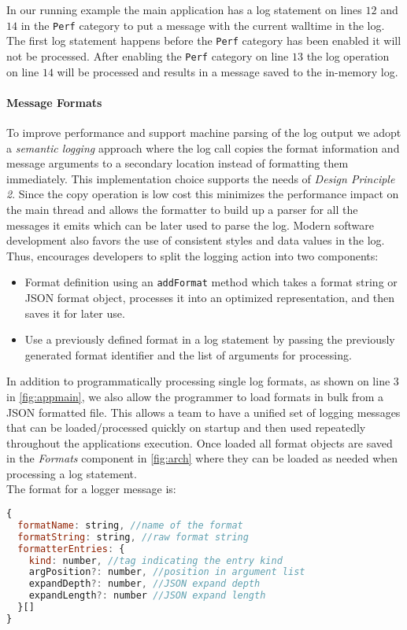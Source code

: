 In our running example the main application has a log statement on lines $12$ and $14$ 
in the \texttt{Perf} category to put a message with the current walltime 
in the log. The first log statement happens before the \texttt{Perf} category has 
been enabled it will not be processed. After enabling the \texttt{Perf} category 
on line $13$ the log operation on line $14$ will be processed and results in a message 
saved to the in-memory log.

\paragraph{Message Formats}
\noindent
To improve performance and support machine parsing of the log output we 
adopt a \emph{semantic logging} approach where the log call copies the format 
information and message arguments to a secondary location instead of formatting them 
immediately. This implementation choice supports the needs of \emph{Design Principle 2}.
Since the copy operation is low cost this minimizes the 
performance impact on the main thread and allows the formatter to build up a 
parser for all the messages it emits which can be later used to parse the log. 
Modern software development also favors the use of consistent styles and data 
values in the log. Thus, \projn encourages developers to split the logging 
action into two components:
\begin{itemize}
\item Format definition using an \texttt{addFormat} method which takes a format 
string or JSON format object, processes it into an optimized representation, 
and then saves it for later use.
\item Use a previously defined format in a log statement by passing the 
previously generated format identifier and the list of 
arguments for processing.
\end{itemize}

In addition to programmatically processing single log formats, as shown on line 3 
in \autoref{fig:appmain}, we also allow the programmer to load formats in bulk 
from a JSON formatted file. This allows a team to have a unified set of logging 
messages that can be loaded/processed quickly on startup and then used repeatedly 
throughout the applications execution. Once loaded all format objects are saved 
in the \emph{Formats} component in \autoref{fig:arch} where they can be loaded 
as needed when processing a log statement.\\

\noindent
The format for a logger message is:
\begin{lstlisting}[language=JavaScript,basicstyle=\scriptsize]
{
  formatName: string, //name of the format
  formatString: string, //raw format string
  formatterEntries: {
    kind: number, //tag indicating the entry kind
    argPosition?: number, //position in argument list
    expandDepth?: number, //JSON expand depth
    expandLength?: number //JSON expand length
  }[]
}
\end{lstlisting}

